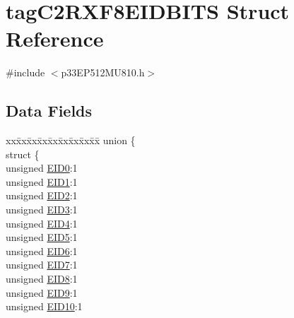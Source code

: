 \hypertarget{structtag_c2_r_x_f8_e_i_d_b_i_t_s}{}\section{tag\+C2\+R\+X\+F8\+E\+I\+D\+B\+I\+TS Struct Reference}
\label{structtag_c2_r_x_f8_e_i_d_b_i_t_s}


{\ttfamily \#include $<$p33\+E\+P512\+M\+U810.\+h$>$}

\subsection*{Data Fields}
\begin{DoxyCompactItemize}
\item 
\begin{tabbing}
xx\=xx\=xx\=xx\=xx\=xx\=xx\=xx\=xx\=\kill
union \{\\
\>struct \{\\
\>\>unsigned \hyperlink{structtag_c2_r_x_f8_e_i_d_b_i_t_s_a9da8b7b30247e4f9cd8cc056549aa9fd}{EID0}:1\\
\>\>unsigned \hyperlink{structtag_c2_r_x_f8_e_i_d_b_i_t_s_afd6c139491d147c1262f3d051c6691e9}{EID1}:1\\
\>\>unsigned \hyperlink{structtag_c2_r_x_f8_e_i_d_b_i_t_s_a36ec62d8d3c5acd5d15e6691dc099a94}{EID2}:1\\
\>\>unsigned \hyperlink{structtag_c2_r_x_f8_e_i_d_b_i_t_s_ab895f7d0ac289a0383b607cbc62eebe2}{EID3}:1\\
\>\>unsigned \hyperlink{structtag_c2_r_x_f8_e_i_d_b_i_t_s_a136d5a709d6618d40acceccb43036656}{EID4}:1\\
\>\>unsigned \hyperlink{structtag_c2_r_x_f8_e_i_d_b_i_t_s_a8dffb2d86a6c184df505ae7c71a58710}{EID5}:1\\
\>\>unsigned \hyperlink{structtag_c2_r_x_f8_e_i_d_b_i_t_s_af8a8574102515d8f1a4b7fd1685d0532}{EID6}:1\\
\>\>unsigned \hyperlink{structtag_c2_r_x_f8_e_i_d_b_i_t_s_a84c3262e67f8d5fd387ac10bde6fa9b1}{EID7}:1\\
\>\>unsigned \hyperlink{structtag_c2_r_x_f8_e_i_d_b_i_t_s_acca25e0b7d86eb499d01f85222baea87}{EID8}:1\\
\>\>unsigned \hyperlink{structtag_c2_r_x_f8_e_i_d_b_i_t_s_ac6748f73d4ada8538b06548be4f396c2}{EID9}:1\\
\>\>unsigned \hyperlink{structtag_c2_r_x_f8_e_i_d_b_i_t_s_a9cea8e77ecbb72bd3b08102412793725}{EID10}:1\\

\end{tabbing}
\end{DoxyCompactItemize}
